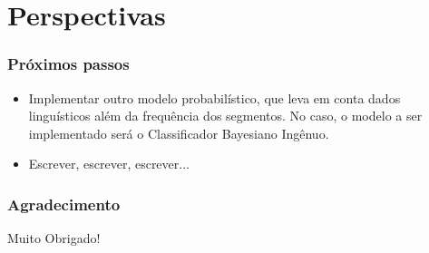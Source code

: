 \documentclass[xcolor=table]{beamer}
\begin{document}
	\section{Perspectivas}
	\begin{frame}
		\frametitle{Próximos passos}
		\begin{itemize}
			\item Implementar outro modelo probabilístico, que leva em conta dados linguísticos além da frequência dos segmentos. No caso, o modelo a ser implementado será o Classificador Bayesiano Ingênuo.\\
			
			\item Escrever, escrever, escrever...
		\end{itemize}
	\end{frame}
	\begin{frame}
		\frametitle{Agradecimento}
		Muito Obrigado!
		
	\end{frame}
\end{document}
